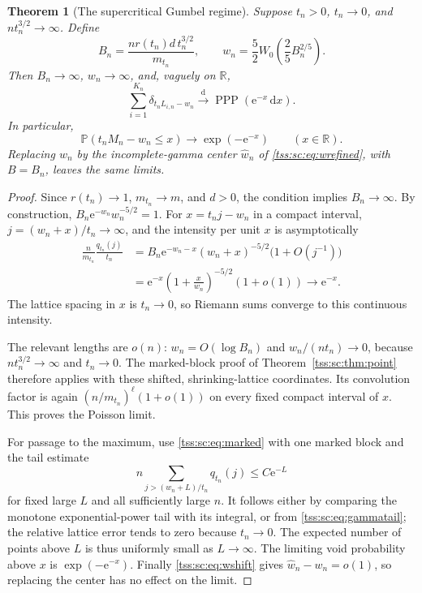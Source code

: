 \documentclass[11pt]{article}
\newtheorem{theorem}{Theorem}[section]
\theoremstyle{remark}\newtheorem{remark}[theorem]{Remark}
\theoremstyle{definition}\newtheorem{definition}[theorem]{Definition}
\newcommand{\dd}{\mathrm d}
\newcommand{\e}{\mathrm e}
\newcommand{\Prob}{\mathbb P}
\newcommand{\R}{\mathbb R}
\newcommand{\dto}{\xrightarrow{\mathrm d}}
\DeclareMathOperator{\PPP}{PPP}
\begin{document}
\begin{theorem}[The supercritical Gumbel regime]\label{tss:sc:thm:gumbel}
Suppose $t_n>0$, $t_n\to0$, and $nt_n^{3/2}\to\infty$. Define
\begin{equation}\label{tss:sc:eq:Bn}
 B_n=\frac{n r(t_n)d\,t_n^{3/2}}{m_{t_n}},\qquad
 w_n=\frac52W_0\left(\frac25 B_n^{2/5}\right).
\end{equation}
Then $B_n\to\infty$, $w_n\to\infty$, and, vaguely on $\R$,
\begin{equation}\label{tss:sc:eq:gumbelPPP}
 \sum_{i=1}^{K_n}\delta_{t_n L_{i,n}-w_n}
 \dto\PPP(\e^{-x}\,\dd x).
\end{equation}
In particular,
\begin{equation}\label{tss:sc:eq:gumbel}
 \boxed{\displaystyle
 \Prob(t_nM_n-w_n\leq x)\longrightarrow\exp(-\e^{-x})
 \qquad(x\in\R).}
\end{equation}
Replacing $w_n$ by the incomplete-gamma center $\widehat w_n$ of \eqref{tss:sc:eq:wrefined}, with $B=B_n$, leaves the same limits.
\end{theorem}
\begin{proof}
Since $r(t_n)\to1$, $m_{t_n}\to m$, and $d>0$, the condition implies $B_n\to\infty$. By construction,
$B_n\e^{-w_n}w_n^{-5/2}=1$. For $x=t_nj-w_n$ in a compact interval, $j=(w_n+x)/t_n\to\infty$, and the intensity per unit $x$ is asymptotically
\begin{align*}
 \frac n{m_{t_n}}\frac{q_{t_n}(j)}{t_n}
 &=B_n\e^{-w_n-x}(w_n+x)^{-5/2}\bigl(1+O(j^{-1})\bigr)\\
 &=\e^{-x}\left(1+\frac{x}{w_n}\right)^{-5/2}(1+o(1))
 \longrightarrow\e^{-x}.
\end{align*}
The lattice spacing in $x$ is $t_n\to0$, so Riemann sums converge to this continuous intensity.

The relevant lengths are $o(n)$: $w_n=O(\log B_n)$ and
$w_n/(nt_n)\to0$, because $nt_n^{3/2}\to\infty$ and $t_n\to0$. The marked-block proof of Theorem~\ref{tss:sc:thm:point} therefore applies with these shifted, shrinking-lattice coordinates. Its convolution factor is again $(n/m_{t_n})^\ell(1+o(1))$ on every fixed compact interval of $x$. This proves the Poisson limit.

For passage to the maximum, use \eqref{tss:sc:eq:marked} with one marked block and the tail estimate
\[
 n\sum_{j>(w_n+L)/t_n}q_{t_n}(j)\leq C\e^{-L}
\]
for fixed large $L$ and all sufficiently large $n$. It follows either by comparing the monotone exponential-power tail with its integral, or from \eqref{tss:sc:eq:gammatail}; the relative lattice error tends to zero because $t_n\to0$. The expected number of points above $L$ is thus uniformly small as $L\to\infty$. The limiting void probability above $x$ is $\exp(-\e^{-x})$. Finally \eqref{tss:sc:eq:wshift} gives $\widehat w_n-w_n=o(1)$, so replacing the center has no effect on the limit.
\end{proof}
\end{document}
